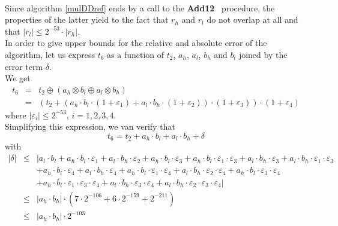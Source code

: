 \documentclass[a4paper,10pt,twoside]{article}
\newenvironment{proof}[1][Proof]{\begin{trivlist}
\item[\hskip \labelsep {\bfseries #1}]}{\end{trivlist}}
\newcommand{\hi}{\ensuremath{\mathit{h}}}
\newcommand{\lo}{\ensuremath{\mathit{l}}}
\newcommand{\Add}{{\bf Add12}}
\renewcommand{\epsilon}{\varepsilon}
\begin{document}
\begin{proof} ~ \\
Since algorithm \ref{mulDDref} ends by a call to the \Add~ procedure, 
the properties of the latter yield to the fact that $r_\hi$ and $r_\lo$
do not overlap at all and that $\left \vert r_\lo \right \vert \leq 2^{-53} \cdot \left \vert r_\hi \right \vert$.\\
In order to give upper bounds for the relative and absolute error of the
algorithm, let us express $t_6$ as a function of $t_2$, $a_\hi$, $a_\lo$,
$b_\hi$ and $b_\lo$ joined by the error term $\delta$.\\
We get
\begin{eqnarray*}
t_6 & = & t_2 \oplus \left( a_\hi \otimes b_\lo \oplus a_\lo \otimes b_\hi \right) \\
& = & \left( t_2 + \left(a_\hi \cdot b_\lo \cdot \left( 1 + \epsilon_1 \right) + a_\lo \cdot b_\hi \cdot \left( 1 + \epsilon_2 \right) \right) \cdot
\left(1 + \epsilon_3 \right) \right)\cdot \left( 1 + \epsilon_4 \right)
\end{eqnarray*}
where $\left \vert \epsilon_i \right \vert \leq 2^{-53}$, $i=1,2,3,4$.\\
Simplifying this expression, we van verify that 
$$t_6 = t_2 + a_\hi \cdot b_\lo + a_\lo \cdot b_\hi + \delta$$
with
\begin{eqnarray*}
\left \vert \delta \right \vert & \leq & \left \vert a_\lo \cdot b_\lo + a_\hi \cdot b_\lo \cdot \epsilon_1 + a_\lo \cdot b_\hi \cdot \epsilon_2 +
a_\hi \cdot b_\lo \cdot \epsilon_3 + a_\hi \cdot b_\lo \cdot \epsilon_1 \cdot \epsilon_3 + a_\lo \cdot b_\hi \cdot \epsilon_3 +
a_\lo \cdot b_\hi \cdot \epsilon_1 \cdot \epsilon_3 \right.\\
& & \left. + a_\hi \cdot b_\lo \cdot \epsilon_4 + a_\lo \cdot b_\hi \cdot \epsilon_4 +
a_\hi \cdot b_\lo \cdot \epsilon_1 \cdot \epsilon_4 + a_\lo \cdot b_\hi \cdot \epsilon_2 \cdot \epsilon_4 + 
a_\hi \cdot b_\lo \cdot \epsilon_3 \cdot \epsilon_4 \right. \\ 
& & \left. + a_\hi \cdot b_\lo \cdot \epsilon_1 \cdot \epsilon_3 \cdot \epsilon_4 + a_\lo \cdot b_\hi \cdot \epsilon_3 \cdot \epsilon_4 + a_\lo \cdot b_\hi \cdot \epsilon_2 \cdot \epsilon_3 \cdot \epsilon_4 \right \vert \\
& \leq & \left \vert a_\hi \cdot b_\hi \right \vert \cdot \left( 7 \cdot 2^{-106} + 6 \cdot 2^{-159} + 2^{-211} \right) \\
& \leq & \left \vert a_\hi \cdot b_\hi \right \vert \cdot 2^{-103}
\end{eqnarray*}

\end{proof}
\end{document}
